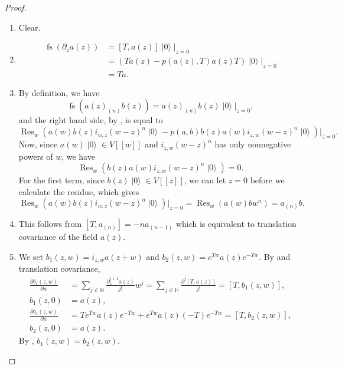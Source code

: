 \documentclass[a4paper, 12pt, reqno]{amsart}
\theoremstyle{remark}
\numberwithin{equation}{subsection}
\DeclareMathOperator{\Res}{Res}
\DeclareMathOperator{\vac}{|0\rangle}
\DeclareMathOperator{\fs}{fs}
\begin{document}
\begin{proof}\leavevmode
  \begin{enumerate}
  \item Clear.
  \item
    \begin{align*}
      \fs(\partial_za(z)) &= [T, a(z)]\vac|_{z = 0} \\
      &= (Ta(z) - p(a(z), T)a(z)T)\vac|_{z = 0} \\
      &= Ta.
    \end{align*}
  \item By definition, we have
    \begin{equation*}
      \fs(a(z)_{(n)}b(z)) = a(z)_{(n)}b(z)\vac|_{z = 0},
    \end{equation*}
    and the right hand side, by , is equal to
    \begin{equation*}
      \Res_w(a(w)b(z)i_{w, z}(w - z)^n\vac - p(a, b)b(z)a(w)i_{z, w}(w - z)^n\vac)|_{z = 0}.
    \end{equation*}
    Now, since $a(w)\vac \in V[[w]]$ and $i_{z, w}(w - z)^n$ has only nonnegative powers of $w$, we have
    \begin{equation*}
      \Res_w(b(z)a(w)i_{z, w}(w - z)^n\vac) = 0.
    \end{equation*}
    For the first term, since $b(z)\vac \in V[[z]]$, we can let $z = 0$ before we calculate the residue, which gives
    \begin{equation*}
      \Res_w(a(w)b(z)i_{w, z}(w - z)^n\vac)|_{z = 0} = \Res_w(a(w)bw^n) = a_{(n)}b.
    \end{equation*}
  \item This follows from $[T, a_{(n)}] = -na_{(n - 1)}$ which is equivalent to translation covariance of the field $a(z)$.
  \item We set $b_1(z, w) = i_{z, w}a(z + w)$ and $b_2(z, w) = e^{Tw}a(z)e^{-Tw}$.
    By  and translation covariance,
    \begin{align*}
      \frac{\partial b_1(z, w)}{\partial w} &= \sum_{j \in \mathbb{N}}\frac{\partial^{j + 1}_za(z)}{j!}w^j = \sum_{j \in \mathbb{N}}\frac{\partial^j[T, a(z)]}{j!} = [T, b_1(z, w)], \\
      b_1(z, 0) &= a(z), \\
      \frac{\partial b_1(z, w)}{\partial w} &= Te^{Tw}a(z)e^{-Tw} + e^{Tw}a(z)(-T)e^{-Tw} = [T, b_2(z, w)], \\
      b_2(z, 0) &= a(z).
    \end{align*}
    By , $b_1(z, w) = b_2(z, w)$.

\end{enumerate}
\end{proof}
\end{document}
